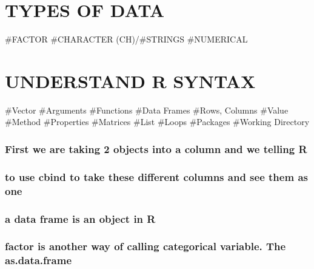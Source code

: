 \documentclass[
]{article}
\begin{document}
\hypertarget{types-of-data}{%
\section{TYPES OF DATA}\label{types-of-data}}

\#FACTOR \#CHARACTER (CH)/\#STRINGS \#NUMERICAL

\hypertarget{section-2}{%
\section{}\label{section-2}}

\hypertarget{understand-r-syntax}{%
\section{UNDERSTAND R SYNTAX}\label{understand-r-syntax}}

\#Vector \#Arguments \#Functions \#Data Frames \#Rows, Columns \#Value
\#Method \#Properties \#Matrices \#List \#Loops \#Packages \#Working
Directory

\hypertarget{first-we-are-taking-2-objects-into-a-column-and-we-telling-r}{%
\subsubsection{First we are taking 2 objects into a column and we
telling
R}\label{first-we-are-taking-2-objects-into-a-column-and-we-telling-r}}

\hypertarget{to-use-cbind-to-take-these-different-columns-and-see-them-as-one}{%
\subsubsection{to use cbind to take these different columns and see them
as
one}\label{to-use-cbind-to-take-these-different-columns-and-see-them-as-one}}

\hypertarget{a-data-frame-is-an-object-in-r}{%
\subsubsection{a data frame is an object in
R}\label{a-data-frame-is-an-object-in-r}}

\hypertarget{factor-is-another-way-of-calling-categorical-variable.-the-as.data.frame}{%
\subsubsection{factor is another way of calling categorical variable.
The
as.data.frame}\label{factor-is-another-way-of-calling-categorical-variable.-the-as.data.frame}}
\end{document}
